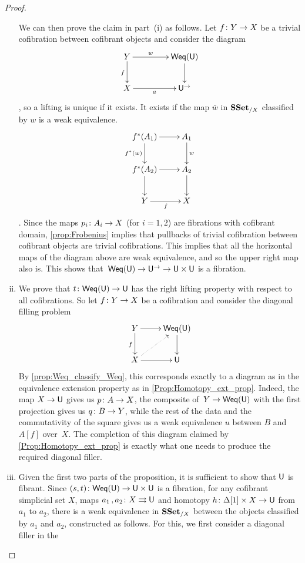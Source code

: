 \documentclass[reqno,10pt,a4paper,oneside,draft]{amsart}
\begin{document}
\begin{proof}
\begin{enumerate}[(i)]
We can then prove the claim in part~(i) as follows. 
Let $f \colon Y \to X$ be a trivial cofibration between cofibrant objects and consider the diagram
\[ 
\xymatrix@C=1.5cm{ Y \ar[d]_f \ar[r]^-{w} & \mathsf{Weq}(\U) \ar[d] \\
X \ar[r]_-{a} & \U^{\rightarrow} }
\]
, so a lifting is unique if it exists. It exists if the map $\bar{w}$ in $\mathbf{SSet}_{/X}$ classified by $w$ is a weak equivalence. 
\[ 
\xymatrix{ 
f^*(A_1) \ar[d]_{f^*(w)}  \ar[r]  & A_1 \ar[d]^{w} \\
f^*(A_2) \ar[r] \ar[d]   & A_2 \ar[d] \\
Y \ar[r]_f & X }
\]
.
Since the maps $p_i \colon A_i \rightarrow X$ (for $i = 1, 2$) are fibrations with cofibrant domain, \cref{prop:Frobenius} implies that pullbacks of trivial cofibration between cofibrant objects 
 are trivial cofibrations. This implies that all the horizontal maps of the diagram above are weak equivalence, and so the upper right map also is. This shows that~$\mathsf{Weq}(\mathsf{U}) \rightarrow \mathsf{U}^{\rightarrow} \rightarrow \mathsf{U} \times \mathsf{U}$ is a fibration.
\item We prove that $t \colon  \mathsf{Weq}(\mathsf{U}) \to \mathsf{U}$ has the right lifting property with respect
to all cofibrations. So let $f \colon Y \rightarrow X$ be a cofibration and consider the diagonal
filling problem
\[
\xymatrix{Y \ar[d]_f \ar[r] & \mathsf{Weq}(\U) \ar[d] \\
X \ar[r] \ar@{.>}[ur]  & \U 
}
\]
By  \cref{prop:Weq_classify_Weq}, this corresponds exactly to a diagram as in the equivalence extension property as in \cref{Prop:Homotopy_ext_prop}. Indeed, the map $X \rightarrow \mathsf{U}$ gives us
$p \colon A \to X$, the composite of~$Y \rightarrow  \mathsf{Weq}(\mathsf{U})$ with the first projection
gives us $q \colon B \to Y$, while the rest of the data and the commutativity of the square 
gives us a weak equivalence $u$ between $B$ and $A[f]$ over~$X$. The completion of this diagram claimed by \cref{Prop:Homotopy_ext_prop} is exactly what one needs to produce the required diagonal filler.
\item Given the first two parts of the proposition, it is sufficient to show that $\mathsf{U}$ is fibrant. Since
$(s, t) \colon \mathsf{Weq}(\mathsf{U}) \rightarrow \mathsf{U} \times \mathsf{U}$ is a fibration, for any cofibrant 
simplicial set $X$,  maps $a_1 \, , a_2 \colon X \rightrightarrows \mathsf{U}$ and homotopy $h \colon \Delta[1] \times X \rightarrow \mathsf{U}$ from $a_1$ to $a_2$, there is a weak equivalence in $\mathbf{SSet}_{/X}$ between the objects classified by $a_1$ and $a_2$, constructed as follows. For this, we first consider a diagonal filler in the

\end{enumerate}
\end{proof}
\end{document}
